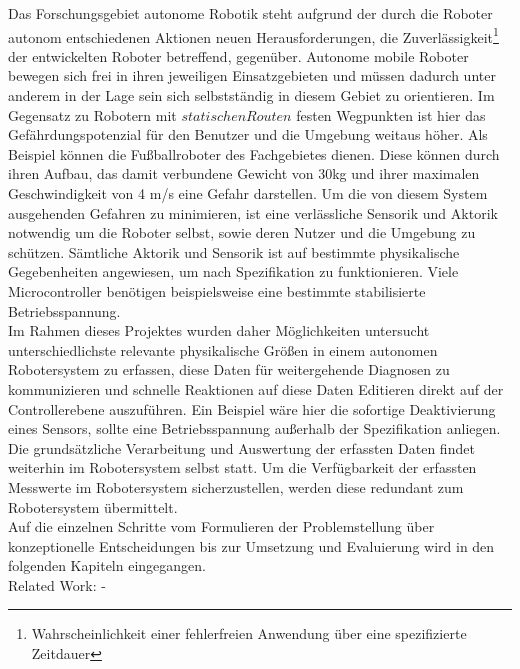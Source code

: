 \documentclass[
	11pt,								%
	a4paper,						%
	oneside,						%
	titlepage,					%
	headsepline,				%
	DIV13,							%
	abstracton,	 				%
	BCOR0cm,						%
	bibliography=totoc, %
]{scrreprt}							%
\begin{document}
Das Forschungsgebiet autonome Robotik steht aufgrund der durch die Roboter autonom entschiedenen Aktionen neuen Herausforderungen, die Zuverlässigkeit\footnote
{Wahrscheinlichkeit einer fehlerfreien Anwendung über eine spezifizierte Zeitdauer\cite{3}}
der entwickelten Roboter betreffend, gegenüber\cite{2}.
Autonome mobile Roboter bewegen sich frei in ihren jeweiligen Einsatzgebieten und müssen dadurch unter anderem in der Lage sein sich selbstständig in diesem Gebiet
zu orientieren. Im Gegensatz zu Robotern mit $statischen Routen$ festen Wegpunkten ist hier das Gefährdungspotenzial für den Benutzer und die Umgebung weitaus höher\cite{1}.
Als Beispiel können die Fußballroboter des Fachgebietes dienen\cite{4}. Diese können durch ihren Aufbau, das damit verbundene Gewicht von 30kg und ihrer
maximalen Geschwindigkeit von 4 m/s eine Gefahr darstellen.
Um die von diesem System ausgehenden Gefahren zu minimieren, ist eine verlässliche Sensorik und Aktorik notwendig um die Roboter selbst, sowie deren Nutzer und die Umgebung zu schützen.
Sämtliche Aktorik und Sensorik ist auf bestimmte physikalische Gegebenheiten angewiesen, um nach Spezifikation zu funktionieren. Viele Microcontroller benötigen beispielsweise eine bestimmte stabilisierte Betriebsspannung.\\
Im Rahmen dieses Projektes wurden daher Möglichkeiten untersucht unterschiedlichste relevante physikalische Größen
in einem autonomen Robotersystem zu erfassen, diese Daten für weitergehende Diagnosen zu kommunizieren und schnelle Reaktionen auf diese Daten 
Editieren
direkt auf der Controllerebene auszuführen. Ein Beispiel wäre hier die sofortige Deaktivierung eines Sensors, sollte eine Betriebsspannung außerhalb der Spezifikation anliegen.\\
Die grundsätzliche Verarbeitung und Auswertung der erfassten Daten findet weiterhin im Robotersystem selbst statt.
Um die Verfügbarkeit der erfassten Messwerte im Robotersystem sicherzustellen, werden diese redundant zum Robotersystem übermittelt.\\
Auf die einzelnen Schritte vom Formulieren der Problemstellung über konzeptionelle Entscheidungen bis zur Umsetzung und Evaluierung wird in den folgenden Kapiteln eingegangen.\\


Related Work:
-


\end{document}
